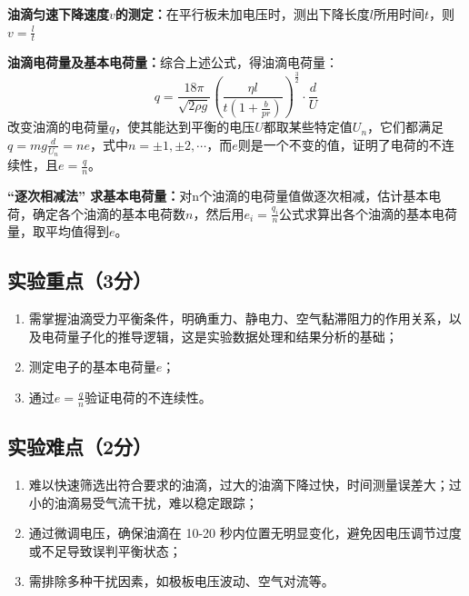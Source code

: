 \documentclass[]{../template/Report}%
\begin{document}
\textbf{油滴匀速下降速度$v$的测定：}在平行板未加电压时，测出下降长度$l$所用时间$t$，则$v = \frac{l}{t}$

\vspace{2mm}
\textbf{油滴电荷量及基本电荷量：}综合上述公式，得油滴电荷量：
\[ q = \frac{18\pi}{\sqrt{2\rho g}} \left( \frac{\eta l}{t\left(1 + \frac{b}{pr}\right)} \right)^{\frac{3}{2}} \cdot \frac{d}{U} \]
改变油滴的电荷量$q$，使其能达到平衡的电压$U$都取某些特定值$U_n$，它们都满足\(q = m g\frac{d}{U_n} = n e\)，式中\(n = \pm1,\pm2,\cdots\)，而$e$则是一个不变的值，证明了电荷的不连续性，且\(e = \frac{q}{n}\)。

\vspace{2mm}
\textbf{“逐次相减法” 求基本电荷量：}对n个油滴的电荷量值做逐次相减，估计基本电荷，确定各个油滴的基本电荷数$n$，然后用\(e_i = \frac{q_i}{n}\)公式求算出各个油滴的基本电荷量，取平均值得到$e$。

\subsection{实验重点（3分）}
\begin{enumerate}
    \item 需掌握油滴受力平衡条件，明确重力、静电力、空气黏滞阻力的作用关系，以及电荷量子化的推导逻辑，这是实验数据处理和结果分析的基础；
    \item 测定电子的基本电荷量$e$；
    \item 通过\(e = \frac{q}{n}\)验证电荷的不连续性。
\end{enumerate}

\subsection{实验难点（2分）}
\begin{enumerate}
    \item 难以快速筛选出符合要求的油滴，过大的油滴下降过快，时间测量误差大；过小的油滴易受气流干扰，难以稳定跟踪；
    \item 通过微调电压，确保油滴在 10-20 秒内位置无明显变化，避免因电压调节过度或不足导致误判平衡状态；
    \item 需排除多种干扰因素，如极板电压波动、空气对流等。
\end{enumerate}
\end{document}
